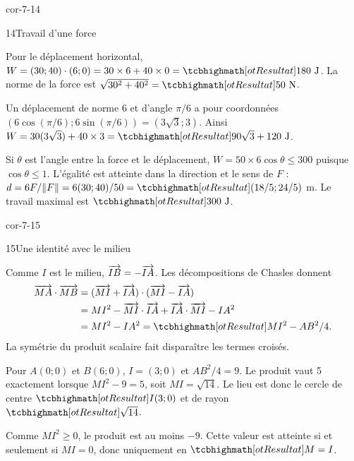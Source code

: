 \begin{blocLivre}{cor-7-14}
\begin{corrige}{14}{Travail d'une force}
\begin{questions}
\item Pour le déplacement horizontal, $W=(30;40)\cdot(6;0)=30\times6+40\times0=\res{180\text{ J}}$.
La norme de la force est $\sqrt{30^2+40^2}=\res{50\text{ N}}$.
\item Un déplacement de norme 6 et d’angle $\pi/6$ a pour coordonnées
$(6\cos(\pi/6);6\sin(\pi/6))=(3\sqrt3;3)$.
Ainsi $W=30(3\sqrt3)+40\times3=\res{90\sqrt3+120\text{ J}}$.
\item Si $\theta$ est l’angle entre la force et le déplacement,
$W=50\times6\cos\theta\leq300$ puisque $\cos\theta\leq1$.
L’égalité est atteinte dans la direction et le sens de $F$ :
$d=6F/\|F\|=6(30;40)/50=\res{(18/5;24/5)}$ m.
Le travail maximal est $\res{300\text{ J}}$.
\end{questions}
\label{figgeo-07-14-cor}
\end{corrige}
\end{blocLivre}
\begin{blocLivre}{cor-7-15}
\begin{corrige}{15}{Une identité avec le milieu}
\begin{questions}
\item Comme $I$ est le milieu, $\overrightarrow{IB}=-\overrightarrow{IA}$.
Les décompositions de Chasles donnent
\begin{align*}
\vect{MA}\cdot\vect{MB}
&=(\vect{MI}+\vect{IA})\cdot(\vect{MI}-\vect{IA})\\
&=MI^2-\vect{MI}\cdot\vect{IA}+\vect{IA}\cdot\vect{MI}-IA^2\\
&=MI^2-IA^2=\res{MI^2-AB^2/4}.
\end{align*}
La symétrie du produit scalaire fait disparaître les termes croisés.
\item Pour $A(0;0)$ et $B(6;0)$, $I=(3;0)$ et $AB^2/4=9$.
Le produit vaut 5 exactement lorsque $MI^2-9=5$, soit $MI=\sqrt{14}$.
Le lieu est donc le cercle de centre $\res{I(3;0)}$ et de rayon $\res{\sqrt{14}}$.
\item Comme $MI^2\geq0$, le produit est au moins $-9$.
Cette valeur est atteinte si et seulement si $MI=0$, donc uniquement en $\res{M=I}$.
\end{questions}
\label{figgeo-07-15-cor}
\end{corrige}
\end{blocLivre}
